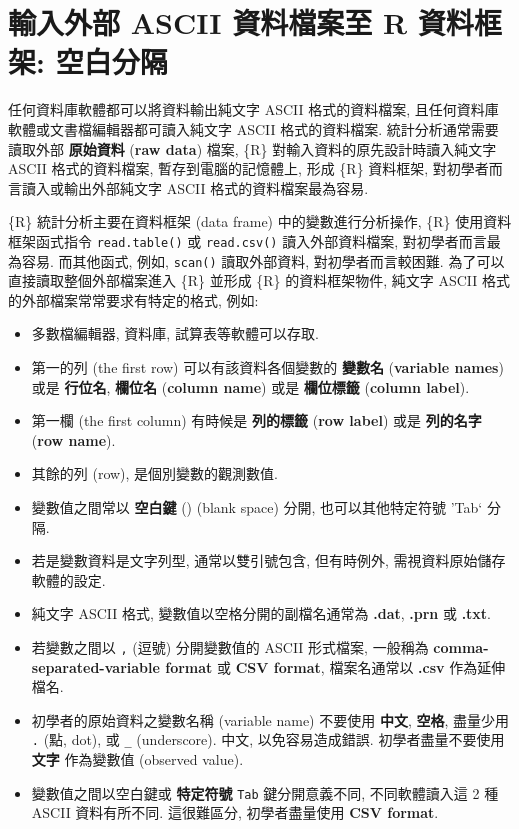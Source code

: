 \documentclass[
]{book}
\providecommand{\tightlist}{%
  \setlength{\itemsep}{0pt}\setlength{\parskip}{0pt}}
\begin{document}
\hypertarget{ux8f38ux5165ux5916ux90e8-ascii-ux8cc7ux6599ux6a94ux6848ux81f3-r-ux8cc7ux6599ux6846ux67b6-ux7a7aux767dux5206ux9694}{%
\section{輸入外部 ASCII 資料檔案至 R 資料框架: 空白分隔}\label{ux8f38ux5165ux5916ux90e8-ascii-ux8cc7ux6599ux6a94ux6848ux81f3-r-ux8cc7ux6599ux6846ux67b6-ux7a7aux767dux5206ux9694}}

任何資料庫軟體都可以將資料輸出純文字 ASCII 格式的資料檔案,
且任何資料庫軟體或文書檔編輯器都可讀入純文字 ASCII 格式的資料檔案.
統計分析通常需要讀取外部 \textbf{原始資料} (\textbf{raw data}) 檔案,
\{R\} 對輸入資料的原先設計時讀入純文字 ASCII 格式的資料檔案,
暫存到電腦的記憶體上, 形成 \{R\} 資料框架,
對初學者而言讀入或輸出外部純文字 ASCII 格式的資料檔案最為容易.

\{R\} 統計分析主要在資料框架 (data frame) 中的變數進行分析操作,
\{R\} 使用資料框架函式指令
\texttt{read.table()}
或
\texttt{read.csv()}
讀入外部資料檔案,
對初學者而言最為容易.
而其他函式,
例如, \texttt{scan()} 讀取外部資料, 對初學者而言較困難.
為了可以直接讀取整個外部檔案進入 \{R\} 並形成 \{R\} 的資料框架物件,
純文字 ASCII 格式的外部檔案常常要求有特定的格式, 例如:

\begin{itemize}
\tightlist
\item
  多數檔編輯器, 資料庫, 試算表等軟體可以存取.
\item
  第一的列 (the first row) 可以有該資料各個變數的 \textbf{變數名} (\textbf{variable names}) 或是 \textbf{行位名}, \textbf{欄位名} (\textbf{column name})
  或是
  \textbf{欄位標籤}
  (\textbf{column label}).\\
\item
  第一欄 (the first column) 有時候是
  \textbf{列的標籤}
  (\textbf{row label})
  或是
  \textbf{列的名字}
  (\textbf{row name}).
\item
  其餘的列 (row), 是個別變數的觀測數值.
\item
  變數值之間常以 \textbf{空白鍵} () (blank space) 分開,
  也可以其他特定符號 'Tab` 分隔.
\item
  若是變數資料是文字列型, 通常以雙引號包含,
  但有時例外, 需視資料原始儲存軟體的設定.
\item
  純文字 ASCII 格式, 變數值以空格分開的副檔名通常為
  \textbf{.dat}, \textbf{.prn} 或 \textbf{.txt}.
\item
  若變數之間以 \texttt{,} (逗號) 分開變數值的 ASCII 形式檔案,
  一般稱為
  \textbf{comma-separated-variable format}
  或
  \textbf{CSV format},
  檔案名通常以
  \textbf{.csv}
  作為延伸檔名.
\item
  初學者的原始資料之變數名稱 (variable name) 不要使用
  \textbf{中文},
  \textbf{空格},
  盡量少用 \texttt{.} (點, dot),
  或 \texttt{\_} (underscore).
  中文, 以免容易造成錯誤.
  初學者盡量不要使用 \textbf{文字} 作為變數值 (observed value).
\item
  變數值之間以空白鍵或 \textbf{特定符號} \texttt{Tab} 鍵分開意義不同,
  不同軟體讀入這 2 種 ASCII 資料有所不同.
  這很難區分, 初學者盡量使用 \textbf{CSV format}.
\end{itemize}
\end{document}
